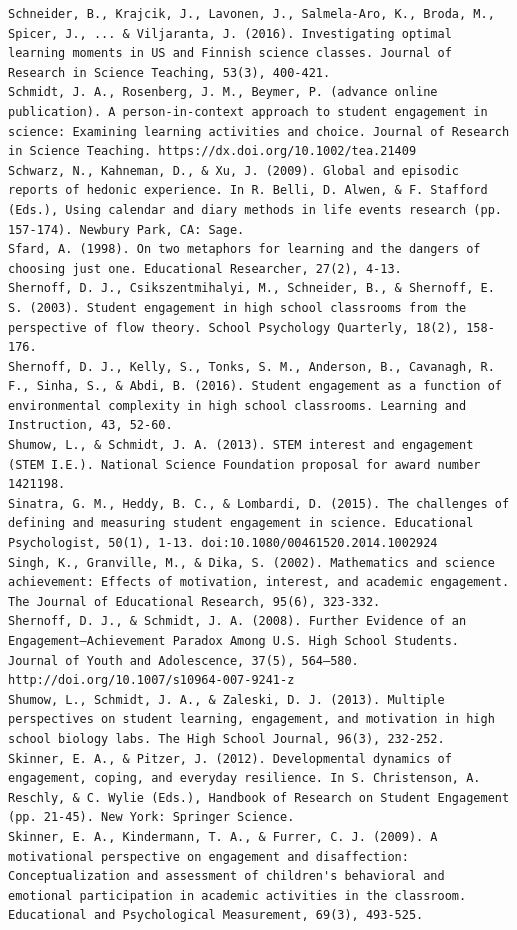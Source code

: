 \documentclass[]{msu-thesis}
\theoremstyle{definition}
\theoremstyle{definition}
\theoremstyle{definition}
\theoremstyle{remark}
\begin{document}
\begin{verbatim}
Schneider, B., Krajcik, J., Lavonen, J., Salmela‐Aro, K., Broda, M., Spicer, J., ... & Viljaranta, J. (2016). Investigating optimal learning moments in US and Finnish science classes. Journal of Research in Science Teaching, 53(3), 400-421.  
Schmidt, J. A., Rosenberg, J. M., Beymer, P. (advance online publication). A person-in-context approach to student engagement in science: Examining learning activities and choice. Journal of Research in Science Teaching. https://dx.doi.org/10.1002/tea.21409  
Schwarz, N., Kahneman, D., & Xu, J. (2009). Global and episodic reports of hedonic experience. In R. Belli, D. Alwen, & F. Stafford (Eds.), Using calendar and diary methods in life events research (pp. 157-174). Newbury Park, CA: Sage.  
Sfard, A. (1998). On two metaphors for learning and the dangers of choosing just one. Educational Researcher, 27(2), 4-13.  
Shernoff, D. J., Csikszentmihalyi, M., Schneider, B., & Shernoff, E. S. (2003). Student engagement in high school classrooms from the perspective of flow theory. School Psychology Quarterly, 18(2), 158-176.  
Shernoff, D. J., Kelly, S., Tonks, S. M., Anderson, B., Cavanagh, R. F., Sinha, S., & Abdi, B. (2016). Student engagement as a function of environmental complexity in high school classrooms. Learning and Instruction, 43, 52-60.  
Shumow, L., & Schmidt, J. A. (2013). STEM interest and engagement (STEM I.E.). National Science Foundation proposal for award number 1421198.  
Sinatra, G. M., Heddy, B. C., & Lombardi, D. (2015). The challenges of defining and measuring student engagement in science. Educational Psychologist, 50(1), 1-13. doi:10.1080/00461520.2014.1002924  
Singh, K., Granville, M., & Dika, S. (2002). Mathematics and science achievement: Effects of motivation, interest, and academic engagement. The Journal of Educational Research, 95(6), 323-332.
Shernoff, D. J., & Schmidt, J. A. (2008). Further Evidence of an Engagement–Achievement Paradox Among U.S. High School Students. Journal of Youth and Adolescence, 37(5), 564–580. http://doi.org/10.1007/s10964-007-9241-z  
Shumow, L., Schmidt, J. A., & Zaleski, D. J. (2013). Multiple perspectives on student learning, engagement, and motivation in high school biology labs. The High School Journal, 96(3), 232-252.  
Skinner, E. A., & Pitzer, J. (2012). Developmental dynamics of engagement, coping, and everyday resilience. In S. Christenson, A. Reschly, & C. Wylie (Eds.), Handbook of Research on Student Engagement (pp. 21-45). New York: Springer Science.  
Skinner, E. A., Kindermann, T. A., & Furrer, C. J. (2009). A motivational perspective on engagement and disaffection: Conceptualization and assessment of children's behavioral and emotional participation in academic activities in the classroom. Educational and Psychological Measurement, 69(3), 493-525.  

\end{verbatim}
\end{document}
